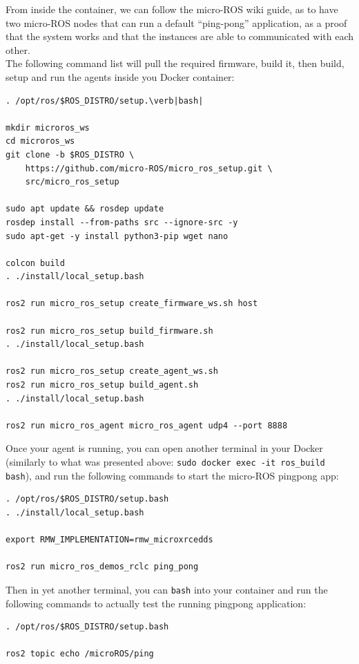 \documentclass[10pt]{article}
\begin{document}
From inside the container, we can follow the micro-ROS wiki guide, as to have two micro-ROS nodes that can run a default ``ping-pong'' application, as a proof that the system works and that the instances are able to communicated with each other.\\
The following command list will pull the required firmware, build it, then build, setup and run the agents inside you Docker container:
\begin{tcolorbox}
\begin{verbatim}
. /opt/ros/$ROS_DISTRO/setup.\verb|bash|

mkdir microros_ws
cd microros_ws
git clone -b $ROS_DISTRO \
    https://github.com/micro-ROS/micro_ros_setup.git \
    src/micro_ros_setup

sudo apt update && rosdep update
rosdep install --from-paths src --ignore-src -y
sudo apt-get -y install python3-pip wget nano

colcon build
. ./install/local_setup.bash

ros2 run micro_ros_setup create_firmware_ws.sh host

ros2 run micro_ros_setup build_firmware.sh
. ./install/local_setup.bash

ros2 run micro_ros_setup create_agent_ws.sh
ros2 run micro_ros_setup build_agent.sh
. ./install/local_setup.bash

ros2 run micro_ros_agent micro_ros_agent udp4 --port 8888
\end{verbatim}
\end{tcolorbox}

Once your agent is running, you can open another terminal in your Docker (similarly to what was presented above: \verb|sudo docker exec -it ros_build bash|), and run the following commands to start the micro-ROS pingpong app:
\begin{tcolorbox}
\begin{verbatim}
. /opt/ros/$ROS_DISTRO/setup.bash
. ./install/local_setup.bash

export RMW_IMPLEMENTATION=rmw_microxrcedds

ros2 run micro_ros_demos_rclc ping_pong
\end{verbatim}
\end{tcolorbox}

Then in yet another terminal, you can \verb|bash| into your container and run the following commands to actually test the running pingpong application:
\begin{tcolorbox}
\begin{verbatim}
. /opt/ros/$ROS_DISTRO/setup.bash

ros2 topic echo /microROS/ping
\end{verbatim}
\end{tcolorbox}
\end{document}
